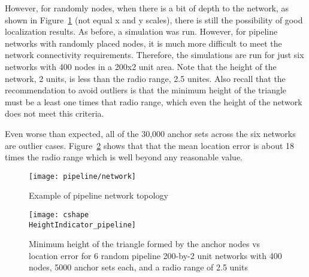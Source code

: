 However, for randomly nodes, when there is a bit of depth to the network, as shown in Figure~\ref{fig:pipeline} (not equal x and y scales), there is still the possibility of good localization results.  As before, a simulation was run.  However, for pipeline networks with randomly placed nodes, it is much more difficult to meet the network connectivity requirements.  Therefore, the simulations are run for just six networks with 400 nodes in a 200x2 unit area.  Note that the height of the network, 2 units, is less than the radio range, 2.5 unites.  Also recall that the recommendation to avoid outliers is that the minimum height of the triangle must be a least one times that radio range, which even the height of the network does not meet this criteria. 

Even worse than expected, all of the 30,000 anchor sets across the six networks are outlier cases.  Figure~\ref{fig:pipelineindicator} shows that that the mean location error is about 18 times the radio range which is well beyond any reasonable value.

\begin{figure}
  \centering
	\texttt{[image: pipeline/network]}
	\caption{Example of pipeline network topology}
	\label{fig:pipeline}
\end{figure}

\begin{figure}
  \centering
	\texttt{[image: cshape\\HeightIndicator\_pipeline]}
	\caption[Minimum height of the triangle formed by the anchor nodes vs location error in a pipeline topology]{Minimum height of the triangle formed by the anchor nodes vs location error for 6 random pipeline 200-by-2 unit networks with 400 nodes, 5000 anchor sets each, and a radio range of 2.5 units}
	\label{fig:pipelineindicator}
\end{figure}
